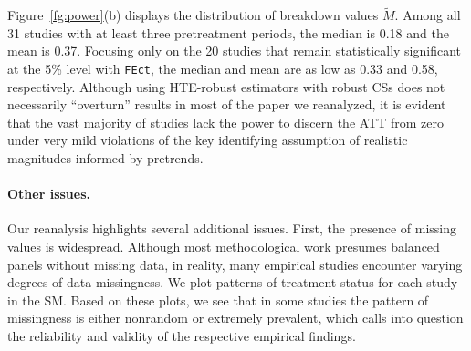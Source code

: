 \documentclass[12pt]{article}
\begin{document}
\begin{figure}[!ht]
\begin{minipage}{1\linewidth}
  \end{minipage}\vspace{-1em}
\end{figure}
Figure~\ref{fg:power}(b) displays the distribution of breakdown values $\tilde{M}$. Among all 31 studies with at least three pretreatment periods, the median is 0.18 and the mean is 0.37. Focusing only on the 20 studies that remain statistically significant at the 5\% level with \texttt{FEct}, the median and mean are as low as 0.33 and 0.58, respectively. Although using HTE-robust estimators with robust CSs does not necessarily ``overturn'' results in most of the paper we reanalyzed, it is evident that the vast majority of studies lack the power to discern the ATT from zero under very mild violations of the key identifying assumption of realistic magnitudes informed by pretrends.


\FloatBarrier

                                                  

\paragraph*{Other issues.} Our reanalysis highlights several additional issues. First, the presence of missing values is widespread. Although most methodological work presumes balanced panels without missing data, in reality, many empirical studies encounter varying degrees of data missingness. We plot patterns of treatment status for each study in the SM. Based on these plots, we see that in some studies the pattern of missingness is either nonrandom or extremely prevalent, which calls into question the reliability and validity of the respective empirical findings. 
\end{document}
